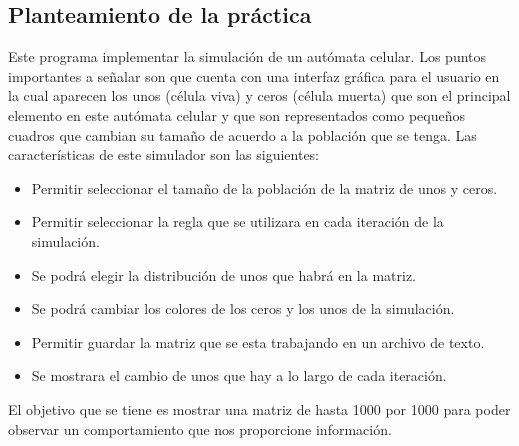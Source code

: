 \subsection{Planteamiento de la práctica}
Este programa implementar la simulación de un autómata celular. Los puntos importantes a señalar son que cuenta con una interfaz gráfica para el usuario en la cual aparecen los unos (célula viva) y ceros (célula muerta) que son el principal elemento en este autómata celular y que son representados como pequeños cuadros que cambian su tamaño de acuerdo a la población que se tenga. Las características de este simulador son las siguientes:
\begin{itemize}
 \item Permitir seleccionar el tamaño de la población de la matriz de unos y ceros.
 \item Permitir seleccionar la regla que se utilizara en cada iteración de la simulación.
 \item Se podrá elegir la distribución de unos que habrá en la matriz.
 \item Se podrá cambiar los colores de los ceros y los unos de la simulación.
 \item Permitir guardar la matriz que se esta trabajando en un archivo de texto.
 \item Se mostrara el cambio de unos que hay a lo largo de cada iteración.
\end{itemize}
El objetivo que se tiene es mostrar una matriz de hasta 1000 por 1000 para poder observar un comportamiento que nos proporcione información.

